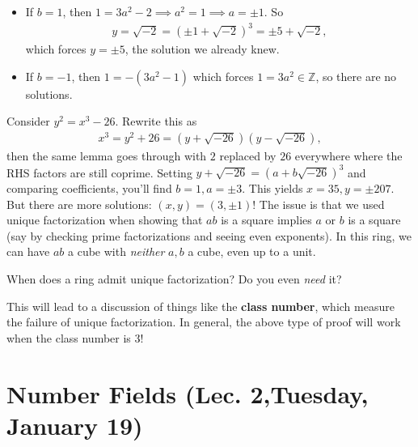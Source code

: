 \begin{example}[Fermat]
\begin{itemize}
\item
  If \(b=1\), then \(1 = 3a^2 -2 \implies a^2 = 1 \implies a = \pm 1\).
  So
  \begin{align*}
  y = \sqrt{-2} = (\pm 1 + \sqrt{-2} )^3 = \pm 5 + \sqrt{-2}
  ,\end{align*}
  which forces \(y=\pm 5\), the solution we already knew.
\item
  If \(b = -1\), then \(1 = -(3a^2 - 1)\) which forces
  \(1=3a^2 \in {\mathbb{Z}}\), so there are no solutions.
\end{itemize}

\end{example}

\begin{example}

Consider \(y^2 = x^3 - 26\). Rewrite this as
\begin{align*}
x^3 = y^2 + 26 = (y + \sqrt{-26} )(y - \sqrt{-26} )
,\end{align*}
then the same lemma goes through with \(2\) replaced by \(26\)
everywhere where the RHS factors are still coprime. Setting
\(y + \sqrt{-26} = (a + b \sqrt{-26} )^3\) and comparing coefficients,
you'll find \(b=1, a = \pm 3\). This yields \(x=35, y=\pm 207\). But
there are more solutions: \((x, y) = (3, \pm 1)\)! The issue is that we
used unique factorization when showing that \(ab\) is a square implies
\(a\) or \(b\) is a square (say by checking prime factorizations and
seeing even exponents). In this ring, we can have \(ab\) a cube with
\emph{neither} \(a,b\) a cube, even up to a unit.

\end{example}

\begin{question}

When does a ring admit unique factorization? Do you even \emph{need} it?

\end{question}

\begin{remark}

This will lead to a discussion of things like the \textbf{class number},
which measure the failure of unique factorization. In general, the above
type of proof will work when the class number is 3!

\end{remark}

\hypertarget{number-fields-lec.-2tuesday-january-19}{%
\section{Number Fields (Lec. 2,Tuesday, January
19)}\label{number-fields-lec.-2tuesday-january-19}}

